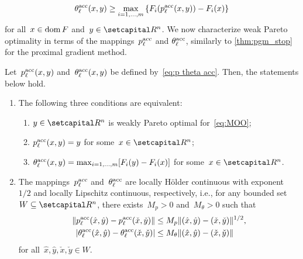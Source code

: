 \documentclass[../main]{subfiles}
\begin{document}
\[ \label{eq:acc approx ineq}
    \theta^{\mathrm{acc}}_\ell(x, y) \ge \max_{i = 1, \dots, m}\left\{ F_i(p^{\mathrm{acc}}_\ell(x, y)) - F_i(x) \right\}
\]
for all~$x \in \operatorname{dom} F$ and~$y \in \setR^n$.
We now characterize weak Pareto optimality in terms of the mappings~$p^{\mathrm{acc}}_\ell$ and $\theta^{\mathrm{acc}}_\ell$, similarly to \cref{thm:pgm_stop} for the proximal gradient method.
\begin{proposition} \label{thm:acc_pgm_stop}
    Let~$p^{\mathrm{acc}}_\ell(x, y)$ and~$\theta^{\mathrm{acc}}_\ell(x, y)$ be defined by~\cref{eq:p theta acc}.
    Then, the statements below hold.
    \begin{enumerate}
        \item The following three conditions are equivalent: 
            \begin{enumerate}
                \item $y \in \setR^n$ is weakly Pareto optimal for~\cref{eq:MOO};
                \item $p^{\mathrm{acc}}_\ell(x, y) = y$ for some~$x \in \setR^n$;
                \item $\theta^{\mathrm{acc}}_\ell(x, y) = \max_{i = 1, \dots, m} [ F_i(y) - F_i(x) ]$ for some~$x \in \setR^n$.
            \end{enumerate}\label{enum: acc prox optimality}
        \item The mappings~$p^{\mathrm{acc}}_\ell$ and~$\theta^{\mathrm{acc}}_\ell$ are locally H\"{o}lder continuous with exponent~$1 / 2$ and locally Lipschitz continuous, respectively, i.e., for any bounded set~$W \subseteq \setR^n$, there exists~$M_p > 0$ and~$M_\theta > 0$ such that
            \begin{align}
                \lVert p^{\mathrm{acc}}_\ell(\hat{x}, \hat{y}) - p^{\mathrm{acc}}_\ell(\check{x}, \check{y})\rVert &\le M_p \lVert(\hat{x}, \hat{y}) - (\check{x}, \check{y})\rVert^{1 / 2}, \\
                \lvert\theta^{\mathrm{acc}}_\ell(\hat{x}, \hat{y}) - \theta^{\mathrm{acc}}_\ell(\check{x}, \check{y})\rvert &\le  M_\theta \lVert(\hat{x}, \hat{y}) - (\check{x}, \check{y})\rVert
            \end{align}
            for all~$\hat{x}, \hat{y}, \check{x}, \check{y} \in W$. \label{enum: continuity}
    \end{enumerate}
\end{proposition}
\end{document}
